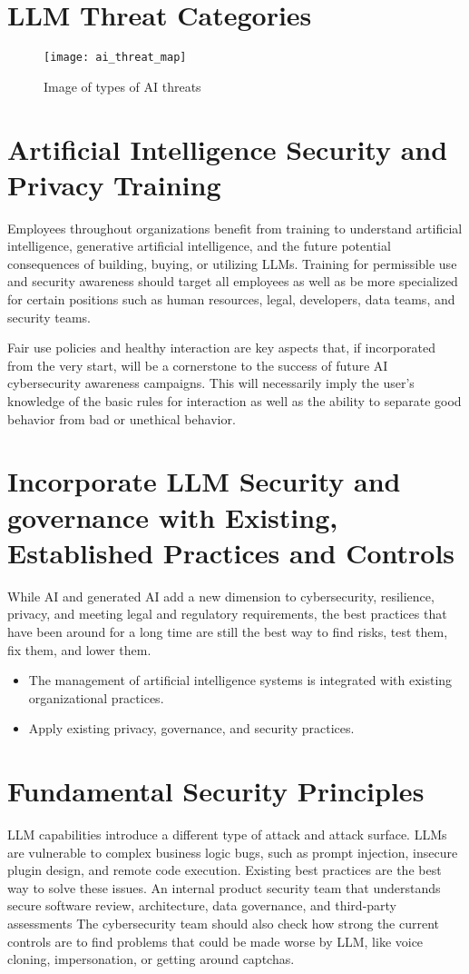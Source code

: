 \clearpage
\section{LLM Threat Categories}
\begin{figure}[h]
  \centering
  \texttt{[image: ai\_threat\_map]}
  \caption{Image of types of AI threats}
  \label{fig:ai-threat-map}
\end{figure}

\section{Artificial Intelligence Security and Privacy Training}
Employees throughout organizations benefit from training to understand
artificial intelligence, generative artificial intelligence, and the future
potential consequences of building, buying, or utilizing LLMs. Training for
permissible use and security awareness should target all employees as well as
be more specialized for certain positions such as human resources, legal,
developers, data teams, and security teams.

Fair use policies and healthy interaction are key aspects that, if incorporated
from the very start, will be a cornerstone to the success of future AI
cybersecurity awareness campaigns. This will necessarily imply the user's
knowledge of the basic rules for interaction as well as the ability to separate
good behavior from bad or unethical behavior.

\section{Incorporate LLM Security and governance with Existing, Established Practices and Controls}
While AI and generated AI add a new dimension to cybersecurity, resilience,
privacy, and meeting legal and regulatory requirements, the best practices that
have been around for a long time are still the best way to find risks, test
them, fix them, and lower them.

\begin{itemize}
  \item The management of artificial intelligence systems is integrated with
  existing organizational practices.
  \item Apply existing privacy, governance, and security practices.
\end{itemize}

\clearpage
\section{Fundamental Security Principles}
LLM capabilities introduce a different type of attack and attack surface. LLMs
are vulnerable to complex business logic bugs, such as prompt injection,
insecure plugin design, and remote code execution. Existing best practices are
the best way to solve these issues. An internal product security team that
understands secure software review, architecture, data governance, and
third-party assessments The cybersecurity team should also check how strong
the current controls are to find problems that could be made worse by LLM,
like voice cloning, impersonation, or getting around captchas.

